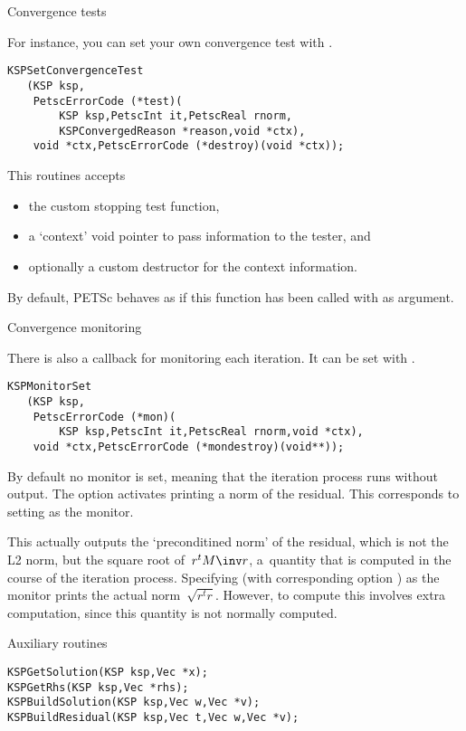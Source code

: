  {Convergence tests}

For instance, you can set your own convergence test with
.
\begin{lstlisting}
KSPSetConvergenceTest
   (KSP ksp,
    PetscErrorCode (*test)(
        KSP ksp,PetscInt it,PetscReal rnorm,
        KSPConvergedReason *reason,void *ctx),
    void *ctx,PetscErrorCode (*destroy)(void *ctx));
\end{lstlisting}
This routines accepts 
\begin{itemize}
\item the custom stopping test function,
\item a `context' void pointer to pass information to the tester, and
\item optionally a custom destructor for the context information.
\end{itemize}
By default, PETSc behaves as if this function has been called with
 as argument.

 {Convergence monitoring}

There is also a callback for monitoring each iteration.
It can be set with .
\begin{lstlisting}
KSPMonitorSet
   (KSP ksp,
    PetscErrorCode (*mon)(
        KSP ksp,PetscInt it,PetscReal rnorm,void *ctx),
    void *ctx,PetscErrorCode (*mondestroy)(void**));
\end{lstlisting}
By default no monitor is set, meaning that the iteration process
runs without output.
The option  activates printing
a norm of the residual.
This corresponds to setting 
as the monitor.

This actually outputs the `preconditined norm' of the residual,
which is not the L2 norm, but the square root of~$r^tM\inv r$,
a~quantity that is computed in the course of the iteration process.
Specifying 
(with corresponding option )
as the monitor prints the actual norm~$\sqrt{r^tr}$.
However, to compute this involves extra computation,
since this quantity is not normally computed.

 {Auxiliary routines}

\begin{lstlisting}
KSPGetSolution(KSP ksp,Vec *x);
KSPGetRhs(KSP ksp,Vec *rhs);
KSPBuildSolution(KSP ksp,Vec w,Vec *v);
KSPBuildResidual(KSP ksp,Vec t,Vec w,Vec *v);
\end{lstlisting}

